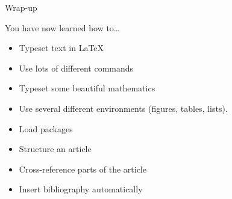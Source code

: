 \documentclass[,aspectratio=43]{beamer}
\providecommand{\tightlist}{%
  \setlength{\itemsep}{0pt}\setlength{\parskip}{0pt}}
\begin{document}
\begin{frame}{Wrap-up}
\protect\hypertarget{wrap-up}{}
\begin{center}
\end{center}

You have now learned how to\ldots{}

\begin{itemize}
\tightlist
\item
  Typeset text in \LaTeX
\item
  Use lots of different commands
\item
  Typeset some beautiful mathematics
\item
  Use several different environments (figures, tables, lists).
\item
  Load packages
\item
  Structure an article
\item
  Cross-reference parts of the article
\item
  Insert bibliography automatically
\end{itemize}
\end{frame}
\end{document}
